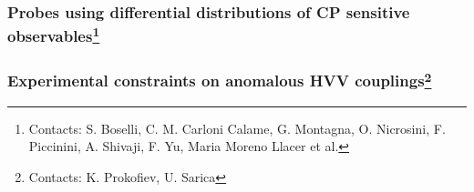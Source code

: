 \subsubsection[Probes using differential distributions of CP sensitive observables]{Probes using differential distributions of CP sensitive observables\footnote{Contacts: S. Boselli, C. M. Carloni Calame, G. Montagna,  O. Nicrosini, F. Piccinini, A. Shivaji, F. Yu, Maria Moreno Llacer et al.}}


\subsubsection[Experimental constraints on anomalous HVV couplings]{Experimental constraints on anomalous HVV couplings\footnote{Contacts: K. Prokofiev, U. Sarica}}
\label{subsection:ACHVVdecay}



